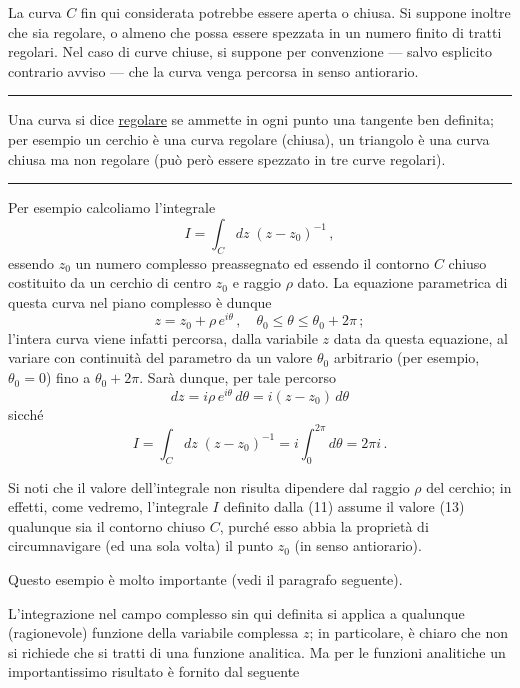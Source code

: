 \documentclass[11pt, a4paper]{book}
\numberwithin{equation}{section}
\begin{document}
La curva $C$ fin qui considerata potrebbe essere aperta o chiusa. Si suppone inoltre che sia regolare, o almeno che possa essere spezzata in un numero finito di tratti regolari. Nel caso di curve chiuse, si suppone per convenzione --- salvo esplicito contrario avviso --- che la curva venga percorsa in senso antiorario.

\noindent\rule{\linewidth}{0.4pt}

Una curva si dice \underline{regolare} se ammette in ogni punto una tangente ben definita; per esempio un cerchio è una curva regolare (chiusa), un triangolo è una curva chiusa ma non regolare (può però essere spezzato in tre curve regolari).

\noindent\rule{\linewidth}{0.4pt}


Per esempio calcoliamo l'integrale
\begin{equation}
I = \int_C dz\;(z - z_0)^{-1}\,, \tag{11}
\end{equation}
essendo $z_0$ un numero complesso preassegnato ed essendo il contorno $C$ chiuso costituito da un cerchio di centro $z_0$ e raggio $\rho$ dato. La equazione parametrica di questa curva nel piano complesso è dunque
\[
z = z_0 + \rho\,e^{i\theta}\,, \quad \theta_0 \leq \theta \leq \theta_0 + 2\pi\,;
\]
l'intera curva viene infatti percorsa, dalla variabile $z$ data da questa equazione, al variare con continuità del parametro da un valore $\theta_0$ arbitrario (per esempio, $\theta_0 = 0$) fino a $\theta_0 + 2\pi$. Sarà dunque, per tale percorso
\begin{equation}
dz = i\rho\,e^{i\theta}\,d\theta = i(z - z_0)\,d\theta \tag{12}
\end{equation}
sicché
\begin{equation}
I = \int_C dz\;(z-z_0)^{-1} = i\int_0^{2\pi} d\theta = 2\pi i\,. \tag{13}
\end{equation}

Si noti che il valore dell'integrale non risulta dipendere dal raggio $\rho$ del cerchio; in effetti, come vedremo, l'integrale $I$ definito dalla (11) assume il valore (13) qualunque sia il contorno chiuso $C$, purché esso abbia la proprietà di circumnavigare (ed una sola volta) il punto $z_0$ (in senso antiorario).

Questo esempio è molto importante (vedi il paragrafo seguente).

L'integrazione nel campo complesso sin qui definita si applica a qualunque (ragionevole) funzione della variabile complessa $z$; in particolare, è chiaro che non si richiede che si tratti di una funzione analitica. Ma per le funzioni analitiche un importantissimo risultato è fornito dal seguente
\end{document}
